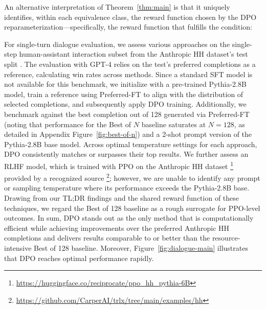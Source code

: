 An alternative interpretation of Theorem~\ref{thm:main} is that it uniquely identifies, within each equivalence class, the reward function chosen by the DPO reparameterization—specifically, the reward function that fulfills the condition:

For single-turn dialogue evaluation, we assess various approaches on the single-step human-assistant interaction subset from the Anthropic HH dataset’s test split \citep{bai2022training}. The evaluation with GPT-4 relies on the test’s preferred completions as a reference, calculating win rates across methods. Since a standard SFT model is not available for this benchmark, we initialize with a pre-trained Pythia-2.8B model, train a reference using Preferred-FT to align with the distribution of selected completions, and subsequently apply DPO training. Additionally, we benchmark against the best completion out of 128 generated via Preferred-FT (noting that performance for the Best of $N$ baseline saturates at $N = 128$, as detailed in Appendix Figure~\ref{fig:best-of-n}) and a 2-shot prompt version of the Pythia-2.8B base model. Across optimal temperature settings for each approach, DPO consistently matches or surpasses their top results. We further assess an RLHF model, which is trained with PPO on the Anthropic HH dataset \footnote{\url{https://huggingface.co/reciprocate/ppo_hh_pythia-6B}} provided by a recognized source \footnote{\url{https://github.com/CarperAI/trlx/tree/main/examples/hh}}; however, we are unable to identify any prompt or sampling temperature where its performance exceeds the Pythia-2.8B base. Drawing from our TL;DR findings and the shared reward function of these techniques, we regard the Best of 128 baseline as a rough surrogate for PPO-level outcomes. In sum, DPO stands out as the only method that is computationally efficient while achieving improvements over the preferred Anthropic HH completions and delivers results comparable to or better than the resource-intensive Best of 128 baseline. Moreover, Figure~\ref{fig:dialogue-main} illustrates that DPO reaches optimal performance rapidly.


